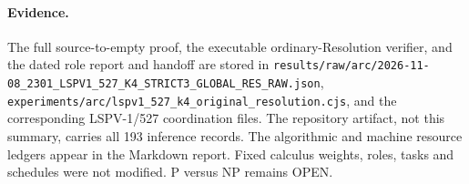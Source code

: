 \documentclass[11pt]{article}
\begin{document}
\paragraph{Evidence.}
The full source-to-empty proof, the executable ordinary-Resolution verifier, and the dated role report and handoff are stored in \texttt{results/raw/arc/2026-11-08\_2301\_LSPV1\_527\_K4\_STRICT3\_GLOBAL\_RES\_RAW.json}, \texttt{experiments/arc/lspv1\_527\_k4\_original\_resolution.cjs}, and the corresponding LSPV-1/527 coordination files. The repository artifact, not this summary, carries all 193 inference records. The algorithmic and machine resource ledgers appear in the Markdown report. Fixed calculus weights, roles, tasks and schedules were not modified. P versus NP remains OPEN.
\end{document}
